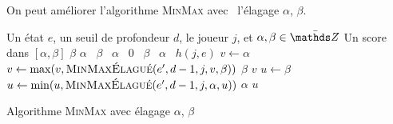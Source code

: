 \begin{exm}
\end{exm}

On peut améliorer l'algorithme \textsc{MinMax} avec \guillemotleft~l'élagage $\alpha$, $\beta$.~\guillemotright\ 

\begin{algorithm}[H]
	\centering
	\begin{algorithmic}[1]
		\Entree Un état $e$, un seuil de profondeur $d$, le joueur $j$, et $\alpha, \beta \in \bar{\Z}$
		\Sortie Un score dans $[\alpha, \beta]$
			 \State\Return $\beta$
			 \State\Return $\alpha$
			\Else
				\ \Return $\beta$
				\ \Return $\alpha$
				\Else\ \Return $0$
				\EndIf
			\EndIf
			\ \Return $\beta$
			\ \Return $\alpha$
			\Else\ \Return $h(j, e)$
			\EndIf
		\Else
				\State $v \gets \alpha$
					\State $v \gets \max(v, \textsc{MinMaxÉlagué}(e', d-1, j, v, \beta))$
						\State\Return $\beta$
					\EndIf
				\EndFor
				\State\Return $v$
			\Else
				\State $u \gets \beta$
					\State $u \gets \min(u, \textsc{MinMaxÉlagué}(e', d-1, j, \alpha, u))$
						\State\Return $\alpha$
					\EndIf
				\EndFor
				\State\Return $u$
			\EndIf
		\EndIf
	\end{algorithmic}
	\caption{Algorithme \textsc{MinMax} avec élagage $\alpha$, $\beta$}
\end{algorithm}

